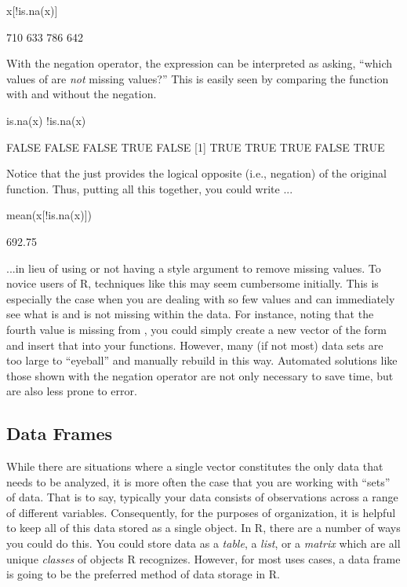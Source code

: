 \begin{inR}
x[!is.na(x)]
\end{inR}
\begin{outR}
[1] 710 633 786 642
\end{outR}

With the negation operator, the expression  can be interpreted as asking, ``which values of  are \textit{not} missing values?''  This is easily seen by comparing the  function with and without the negation.

\begin{inR}
is.na(x)
!is.na(x)
\end{inR}
\begin{outR}
[1] FALSE FALSE FALSE  TRUE FALSE
[1]  TRUE  TRUE  TRUE FALSE  TRUE
\end{outR}

Notice that the \R{!} just provides the logical opposite (i.e., negation) of the original function.  Thus, putting all this together, you could write ...

\begin{inR}
mean(x[!is.na(x)])
\end{inR}
\begin{outR}
[1] 692.75
\end{outR}

...in lieu of using or not having a  style argument to remove missing values.  To novice users of R, techniques like this may seem cumbersome initially.  This is especially the case when you are dealing with so few values and can immediately see what is and is not missing within the data. For instance, noting that the fourth value is missing from , you could simply create a new vector of the form  and insert that into your functions. However, many (if not most) data sets are too large to ``eyeball'' and manually rebuild in this way. Automated solutions like those shown with the negation operator are not only necessary to save time, but are also less prone to error.




\subsection{Data Frames}
\label{sec:data_frames}

While there are situations where a single vector constitutes the only data that needs to be analyzed, it is more often the case that you are working with ``sets'' of data.  That is to say, typically your data consists of observations across a range of different variables.  Consequently, for the purposes of organization, it is helpful to keep all of this data stored as a single object.  In R, there are a number of ways you could do this.  You could store data as a \textit{table}, a \textit{list}, or a \textit{matrix} which are all unique \textit{classes} of objects R recognizes. However, for most uses cases, a \gls{data frame} is going to be the preferred method of data storage in R.

